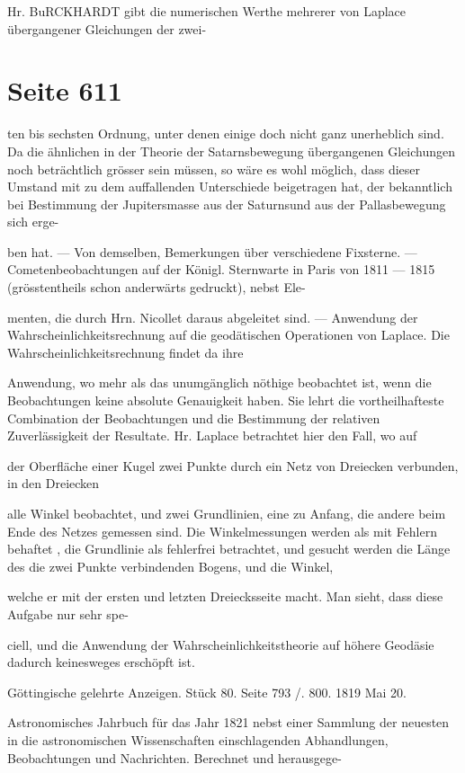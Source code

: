\documentclass[10pt,a4paper]{article}
\begin{document}
Hr. BuRCKHARDT gibt die numerischen Werthe mehrerer von Laplace übergangener Gleichungen der zwei-


\newpage
\section*{Seite 611}
ten bis sechsten Ordnung, unter denen einige doch nicht ganz unerheblich sind. Da die ähnlichen in der Theorie der Satarnsbewegung übergangenen Gleichungen noch beträchtlich grösser sein müssen, so wäre es wohl möglich, dass dieser Umstand mit zu dem auffallenden Unterschiede beigetragen hat, der bekanntlich bei Bestimmung der Jupitersmasse aus der Saturnsund aus der Pallasbewegung sich erge-

ben hat. — Von demselben, Bemerkungen über verschiedene Fixsterne. — Cometenbeobachtungen auf der Königl. Sternwarte in Paris von 1811 — 1815 (grösstentheils schon anderwärts gedruckt), nebst Ele-

menten, die durch Hrn. Nicollet daraus abgeleitet sind. — Anwendung der Wahrscheinlichkeitsrechnung auf die geodätischen Operationen von Laplace. Die Wahrscheinlichkeitsrechnung findet da ihre

Anwendung, wo mehr als das unumgänglich nöthige beobachtet ist, wenn die Beobachtungen keine absolute Genauigkeit haben. Sie lehrt die vortheilhafteste Combination der Beobachtungen und die Bestimmung der relativen Zuverlässigkeit der Resultate. Hr. Laplace betrachtet hier den Fall, wo auf

der Oberfläche einer Kugel zwei Punkte durch ein Netz von Dreiecken verbunden, in den Dreiecken

alle Winkel beobachtet, und zwei Grundlinien, eine zu Anfang, die andere beim Ende des Netzes gemessen sind. Die Winkelmessungen werden als mit Fehlern behaftet , die Grundlinie als fehlerfrei betrachtet, und gesucht werden die Länge des die zwei Punkte verbindenden Bogens, und die Winkel,

welche er mit der ersten und letzten Dreiecksseite macht. Man sieht, dass diese Aufgabe nur sehr spe-

ciell, und die Anwendung der Wahrscheinlichkeitstheorie auf höhere Geodäsie dadurch keinesweges erschöpft ist.

Göttingische gelehrte Anzeigen. Stück 80. Seite 793 /. 800. 1819 Mai 20.

Astronomisches Jahrbuch für das Jahr 1821 nebst einer Sammlung der neuesten in die astronomischen Wissenschaften einschlagenden Abhandlungen, Beobachtungen und Nachrichten. Berechnet und herausgege-
\end{document}
